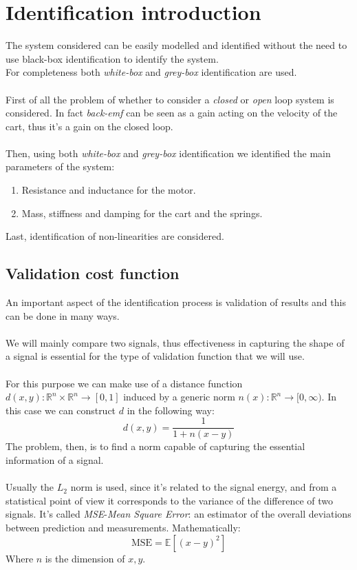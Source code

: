 \chapter{Identification introduction}
The system considered can be easily modelled and identified without the need to use black-box identification to identify the system. \\ For completeness both \emph{white-box} and \emph{grey-box} identification are used.\\ \\
First of all the problem of whether to consider a \emph{closed} or \emph{open} loop system is considered. In fact \emph{back-emf} can be seen as a gain acting on the velocity of the cart, thus it's a gain on the closed loop.\\ \\
Then, using both \emph{white-box} and \emph{grey-box} identification we identified the main parameters of the system: 
\begin{enumerate}
\item Resistance and inductance for the motor.
\item Mass, stiffness and damping for the cart and the springs.
\end{enumerate}
Last, identification of non-linearities are considered.
\section{Validation cost function}
\label{sec:validation_cost_function}
An important aspect of the identification process is validation of results and this can be done in many ways. \\ \\
We will mainly compare two signals, thus effectiveness in capturing the shape of  a signal is essential for the type of validation function that we will use. \\  \\
For this purpose we can make use of a distance function $d(x,y): \mathbb{R}^n \times \mathbb{R}^n\to [0,1]$ induced by a generic norm $n(x) : \mathbb{R}^n \to [0,\infty)$. In this case we can construct $d$ in the following way:
\begin{equation}d(x,y) = \frac{1}{1+n(x-y)}\end{equation}
 The problem, then, is to find a norm capable of capturing the essential information of a signal. \\ \\Usually the $L_2$ norm is used, since it's related to the signal energy, and from a statistical point of view it corresponds to the variance of the difference of two signals. It's called \emph{MSE}-\emph{Mean Square Error}: an estimator of the overall deviations between prediction and measurements. Mathematically:
\begin{equation}\text{MSE} =  \mathbb{E}[(x-y)^2]\end{equation}
Where $n$ is the dimension of $x,y$.

